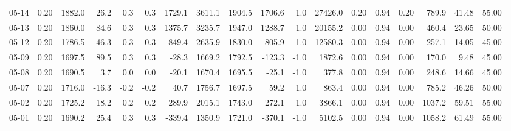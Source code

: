 \begin{threeparttable}
{\begin{tabular}{lrrrrrrrrrrrrrrrrr}
  05-14 &     0.20 & 1882.0 &              26.2 &               0.3 &                0.3 &             1729.1 & 3611.1 & 1904.5 &     1706.6 &                      1.0 &             27426.0 &       0.20 &      0.94 &           0.20 &            789.9 &           41.48 &                  55.00 \\
  05-13 &     0.20 & 1860.0 &              84.6 &               0.3 &                0.3 &             1375.7 & 3235.7 & 1947.0 &     1288.7 &                      1.0 &             20155.2 &       0.00 &      0.94 &           0.00 &            460.4 &           23.65 &                  50.00 \\
  05-12 &     0.20 & 1786.5 &              46.3 &               0.3 &                0.3 &              849.4 & 2635.9 & 1830.0 &      805.9 &                      1.0 &             12580.3 &       0.00 &      0.94 &           0.00 &            257.1 &           14.05 &                  45.00 \\
  05-09 &     0.20 & 1697.5 &              89.5 &               0.3 &                0.3 &              -28.3 & 1669.2 & 1792.5 &     -123.3 &                     -1.0 &              1872.6 &       0.00 &      0.94 &           0.00 &            170.0 &            9.48 &                  45.00 \\
  05-08 &     0.20 & 1690.5 &               3.7 &               0.0 &                0.0 &              -20.1 & 1670.4 & 1695.5 &      -25.1 &                     -1.0 &               377.8 &       0.00 &      0.94 &           0.00 &            248.6 &           14.66 &                  45.00 \\
  05-07 &     0.20 & 1716.0 &             -16.3 &              -0.2 &               -0.2 &               40.7 & 1756.7 & 1697.5 &       59.2 &                      1.0 &               863.4 &       0.00 &      0.94 &           0.00 &            785.2 &           46.26 &                  50.00 \\
  05-02 &     0.20 & 1725.2 &              18.2 &               0.2 &                0.2 &              289.9 & 2015.1 & 1743.0 &      272.1 &                      1.0 &              3866.1 &       0.00 &      0.94 &           0.00 &           1037.2 &           59.51 &                  55.00 \\
  05-01 &     0.20 & 1690.2 &              25.4 &               0.3 &                0.3 &             -339.4 & 1350.9 & 1721.0 &     -370.1 &                     -1.0 &              5102.5 &       0.00 &      0.94 &           0.00 &           1058.2 &           61.49 &                  55.00 \\

\end{tabular}}
\end{threeparttable}
